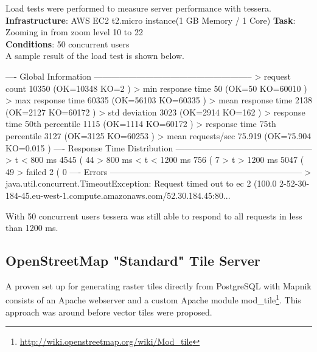 Load tests were performed to measure server performance with tessera.
\\
\textbf{Infrastructure}: AWS EC2 t2.micro instance(1 GB Memory / 1 Core)
\textbf{Task}: Zooming in from zoom level 10 to 22 \\
\textbf{Conditions}: 50 concurrent users \\

A sample result of the load test is shown below.

\begin{bashcode}
---- Global Information --------------------------------------------------------
> request count                                      10350 (OK=10348  KO=2     )
> min response time                                     50 (OK=50     KO=60010 )
> max response time                                  60335 (OK=56103  KO=60335 )
> mean response time                                  2138 (OK=2127   KO=60172 )
> std deviation                                       3023 (OK=2914   KO=162   )
> response time 50th percentile                       1115 (OK=1114   KO=60172 )
> response time 75th percentile                       3127 (OK=3125   KO=60253 )
> mean requests/sec                                 75.919 (OK=75.904 KO=0.015 )
---- Response Time Distribution ------------------------------------------------
> t < 800 ms                                          4545 ( 44%
> 800 ms < t < 1200 ms                                 756 (  7%
> t > 1200 ms                                         5047 ( 49%
> failed                                                 2 (  0%
---- Errors --------------------------------------------------------------------
> java.util.concurrent.TimeoutException: Request timed out to ec      2 (100.0%
2-52-30-184-45.eu-west-1.compute.amazonaws.com/52.30.184.45:80...
\end{bashcode}

With 50 concurrent users tessera was still able to respond to all requests in less than 1200 ms.

\subsection{OpenStreetMap "Standard" Tile Server}\label{osm_standard_tile_server}

A proven set up for generating raster tiles directly from PostgreSQL with Mapnik consists of an Apache webserver and a custom Apache module mod\_tile\footnote{\url{http://wiki.openstreetmap.org/wiki/Mod_tile}}. This approach was around before vector tiles were proposed.

